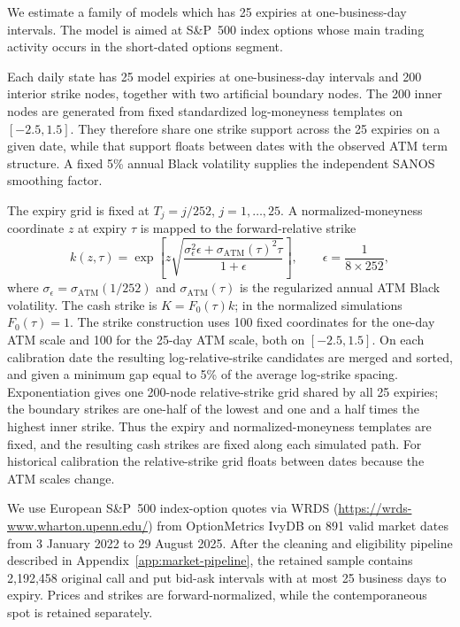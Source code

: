 \documentclass[smallextended,envcountsame,envcountsect]{svjour3}
\begin{document}
We estimate a family of models which has 25 expiries at one-business-day intervals. The model is aimed at S\&P~500 index options
whose main trading activity occurs in the short-dated options segment.

Each daily state has 25 model expiries at one-business-day intervals and 200
interior strike nodes, together with two artificial boundary nodes. The 200
inner nodes are generated from fixed standardized log-moneyness templates on
$[-2.5,1.5]$.
They therefore share one strike support across the 25 expiries on a given
date, while that support floats between dates with the observed ATM term
structure. A fixed 5\% annual Black volatility supplies the independent SANOS
smoothing factor.

The expiry grid is fixed at $T_j=j/252$,
$j=1,\ldots,25$.  A normalized-moneyness coordinate $z$ at expiry $\tau$ is
mapped to the forward-relative strike
\[
  k(z,\tau)=\exp\!\left[z\sqrt{
    \frac{\sigma_{\epsilon}^2\epsilon+
    \sigma_{\mathrm{ATM}}(\tau)^2\tau}{1+\epsilon}}
  \right],
  \qquad \epsilon=\frac{1}{8\times252},
\]
where $\sigma_{\epsilon}=\sigma_{\mathrm{ATM}}(1/252)$ and
$\sigma_{\mathrm{ATM}}(\tau)$ is the regularized annual ATM Black volatility.
The cash strike is $K=F_0(\tau)k$; in the normalized simulations $F_0(\tau)=1$.
The strike construction uses 100 fixed coordinates for the one-day ATM scale
and 100 for the 25-day ATM scale, both on $[-2.5,1.5]$.  On each calibration
date the resulting log-relative-strike candidates are merged and sorted, and
given a minimum gap equal to 5\% of the average log-strike spacing.
Exponentiation gives one 200-node relative-strike grid shared by all 25
expiries; the boundary strikes are one-half of the lowest and one and a half
times the highest inner strike.  Thus the expiry and normalized-moneyness
templates are fixed, and the resulting cash strikes are fixed along each
simulated path.  For historical calibration the relative-strike grid floats
between dates because the ATM scales change.

We use European S\&P~500 index-option quotes via WRDS (\url{https://wrds-www.wharton.upenn.edu/}) from OptionMetrics IvyDB
on 891 valid market dates from 3 January 2022 to 29 August 2025.
After the cleaning and eligibility pipeline described in
Appendix~\ref{app:market-pipeline}, the retained sample contains 2,192,458
original call and put bid-ask intervals with at most 25 business days to
expiry. Prices and strikes are forward-normalized, while the contemporaneous
spot is retained separately.
\end{document}
